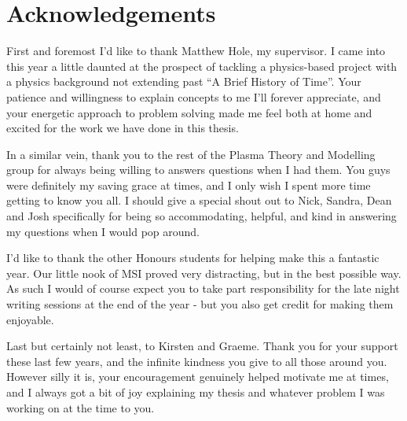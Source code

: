 
\chapter*{Acknowledgements}\label{acknowledgements}


First and foremost I'd like to thank Matthew Hole, my supervisor. I came 
into this year a little daunted at the prospect of tackling a physics-based 
project with a physics background not extending past ``A Brief History of Time''.
Your patience and willingness to explain concepts to me I'll forever appreciate, 
and your energetic approach to problem solving made me feel both at home and excited 
for the work we have done in this thesis. 

In a similar vein, thank you to the rest of the Plasma Theory and Modelling group for always being 
willing to answers questions when I had them. You guys were definitely my saving grace 
at times, and I only wish I spent more time getting to know you all. I should give 
a special shout out to Nick, Sandra, Dean and Josh specifically for being so 
accommodating, helpful, and kind in answering my questions when I would pop around.

I'd like to thank the other Honours students for helping make this a fantastic 
year. Our little nook of MSI proved very distracting, but in the best possible 
way. As such I would of course expect you to take part responsibility for the late night 
writing sessions at the end of the year - but you also get 
credit for making them enjoyable.

Last but certainly not least, to Kirsten and Graeme. Thank you for your support these last 
few years, and the infinite kindness you give to all those around you. However silly it is, 
your encouragement genuinely helped motivate me at times, and I always got a bit of joy 
explaining my thesis and whatever problem I was working on at the time to you.